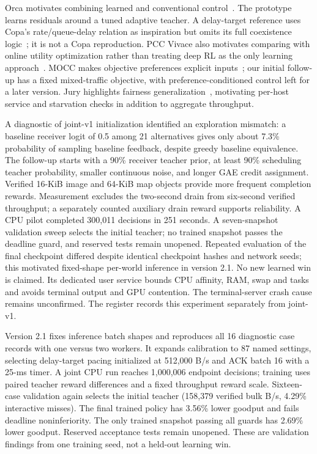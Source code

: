 \documentclass[11pt]{article}
\begin{document}
Orca motivates combining learned and conventional control~\cite{abbasloo2020orca}.
The prototype learns residuals around a tuned adaptive teacher. A delay-target
reference uses Copa's rate/queue-delay relation as inspiration but omits its full
coexistence logic~\cite{arun2018copa}; it is not a Copa reproduction. PCC Vivace
also motivates comparing with online utility optimization rather than treating
deep RL as the only learning approach~\cite{dong2018vivace}. MOCC makes objective
preferences explicit inputs~\cite{ma2022mocc}; our initial follow-up has a fixed
mixed-traffic objective, with preference-conditioned control left for a later
version. Jury highlights fairness generalization~\cite{tian2025jury}, motivating
per-host service and starvation checks in addition to aggregate throughput.

A diagnostic of joint-v1 initialization identified an exploration mismatch: a
baseline receiver logit of 0.5 among 21 alternatives gives only about 7.3\%
probability of sampling baseline feedback, despite greedy baseline equivalence.
The follow-up starts with a 90\% receiver teacher prior, at least 90\% scheduling
teacher probability, smaller continuous noise, and longer GAE credit assignment.
Verified 16-KiB image and 64-KiB map objects provide more frequent completion
rewards. Measurement excludes the two-second drain from six-second verified
throughput; a separately counted auxiliary drain reward supports reliability.
A CPU pilot completed 300,011 decisions in 251 seconds. A seven-snapshot
validation sweep selects the initial teacher; no trained snapshot passes the
deadline guard, and reserved tests remain unopened. Repeated evaluation of the
final checkpoint differed despite identical checkpoint hashes and network seeds;
this motivated fixed-shape per-world inference in version 2.1. No new learned
win is claimed. Its dedicated user service bounds CPU affinity, RAM, swap and tasks and
avoids terminal output and GPU contention. The terminal-server crash cause remains
unconfirmed. The register records this experiment separately from joint-v1.

Version 2.1 fixes inference batch shapes and reproduces all 16 diagnostic
case records with one versus two workers. It expands calibration to 87 named
settings, selecting delay-target pacing initialized at 512,000 B/s and ACK batch
16 with a 25-ms timer. A joint CPU run reaches 1,000,006 endpoint decisions;
training uses paired teacher reward differences and a fixed throughput reward
scale. Sixteen-case validation again selects the initial teacher (158,379
verified bulk B/s, 4.29\% interactive misses). The final trained policy has
3.56\% lower goodput and fails deadline noninferiority. The only trained snapshot
passing all guards has 2.69\% lower goodput. Reserved acceptance tests remain
unopened. These are validation findings from one training seed, not a held-out
learning win.
\end{document}
